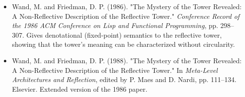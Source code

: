 \begin{itemize}
  \item Wand, M. and Friedman, D. P. (1986). "The Mystery of the Tower Revealed: A Non-Reflective Description of the Reflective Tower." \textit{Conference Record of the 1986 ACM Conference on Lisp and Functional Programming}, pp. 298--307. Gives denotational (fixed-point) semantics to the reflective tower, showing that the tower's meaning can be characterized without circularity.
\end{itemize}

\begin{itemize}
  \item Wand, M. and Friedman, D. P. (1988). "The Mystery of the Tower Revealed: A Non-Reflective Description of the Reflective Tower." In \textit{Meta-Level Architectures and Reflection}, edited by P. Maes and D. Nardi, pp. 111--134. Elsevier. Extended version of the 1986 paper.
\end{itemize}
